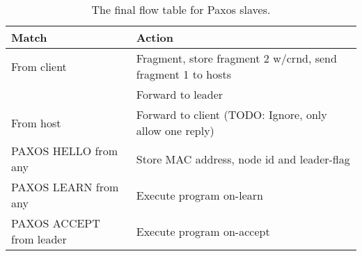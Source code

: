 \begin{table}[H]
  \begin{tabular}{|l|l|}
    \hline \textbf{Match} & \textbf{Action} \\
    \hline From client & Fragment, store fragment 2 w/crnd, send fragment 1 to hosts \\
                       & Forward to leader \\
    \hline From host & Forward to client (TODO: Ignore, only allow one reply) \\
    \hline PAXOS HELLO from any & Store MAC address, node id and leader-flag \\
    \hline PAXOS LEARN from any & Execute program on-learn \\
    \hline PAXOS ACCEPT from leader & Execute program on-accept \\
    \hline
  \end{tabular}
  \caption{The final flow table for Paxos slaves.}
  \label{table:complete.match.slave}
\end{table}
